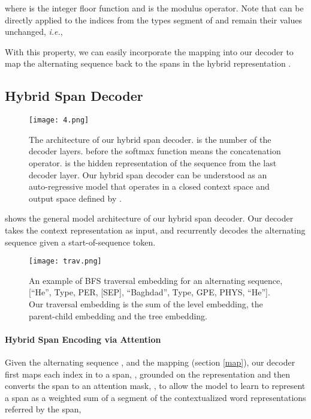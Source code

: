\documentclass[11pt,a4paper]{article}
\begin{document}
where  is the integer floor function and  is the modulus operator.  Note that  can be directly applied to the indices from the types segment of  and remain their values unchanged, \emph{i.e.},  

With this property, we can easily incorporate the mapping  into our decoder to map the alternating sequence  back to the spans in the hybrid representation .



\subsection{Hybrid Span Decoder}


\begin{figure*}[htb]
\centering
\texttt{[image: 4.png]}
\caption{The  architecture of our hybrid span decoder.  is the number of the decoder layers.  before the softmax function means the concatenation operator.  is the hidden representation of the sequence  from the last decoder layer. Our hybrid span decoder can be understood as an auto-regressive model that operates in a closed context space and output space defined by .}\label{f3}
\end{figure*} 


 shows the general model architecture of our hybrid span decoder. Our decoder takes the context representation  as input, and recurrently decodes the alternating sequence  given a start-of-sequence token.







\begin{figure}[t]
\centering
\texttt{[image: trav.png]}
\caption{An example of BFS traversal embedding for an alternating sequence, [``He'', Type, PER, [SEP], ``Baghdad'', Type, GPE, PHYS, ``He'']. Our traversal embedding is the sum of the level embedding, the parent-child embedding and the tree embedding.}\label{ft}
\end{figure}

\paragraph{Hybrid Span Encoding via Attention}
Given the alternating sequence , and the mapping  (section \ref{map}), our decoder first maps each index in  to a span, , grounded on the representation  and then converts the span to an attention mask, , to allow the model to learn to represent a span as a weighted sum of a segment of the contextualized word representations referred by the span,
\end{document}
